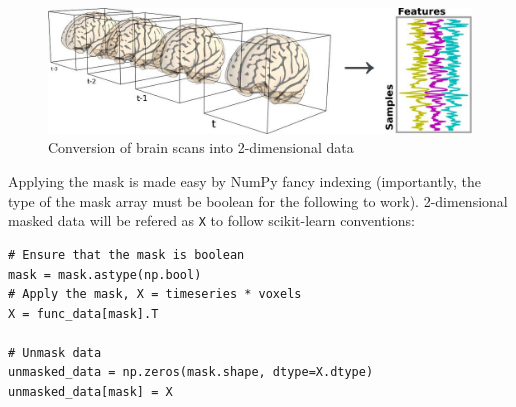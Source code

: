 \documentclass{frontiersSCNS} %
\newcommand{\alex}[1]{\todo[inline, color=green!40]{#1}}
\begin{document}
\begin{figure}[hbtp]
    \begin{center}
        \includegraphics[width=.5\linewidth]{img/niimgs.jpg}
    \end{center}
    \caption{Conversion of brain scans into 2-dimensional data}
    \label{fig:niimg}
\end{figure}

Applying the mask is made easy by NumPy fancy indexing (importantly, the
type of the mask array must be boolean for the following to work).
2-dimensional masked data will be refered as \texttt{X} to follow
scikit-learn conventions:
\begin{lstlisting}
# Ensure that the mask is boolean
mask = mask.astype(np.bool)
# Apply the mask, X = timeseries * voxels
X = func_data[mask].T

# Unmask data
unmasked_data = np.zeros(mask.shape, dtype=X.dtype)
unmasked_data[mask] = X
\end{lstlisting}







%
\end{document}
